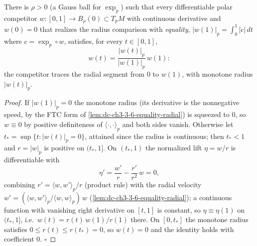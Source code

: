 \begin{lemma}
  \label{lem:dc-ch3-3-6-equality-ray}
  \leanok
  There is $\rho>0$ (a Gauss ball for $\exp_p$) such that every
  differentiable polar competitor $w:[0,1]\to B_\rho(0)\subset T_pM$ with
  continuous derivative and $w(0)=0$ that realizes the radius comparison with
  \emph{equality}, $|w(1)|_p=\int_0^1|\dot c|\,dt$ where $c=\exp_p\circ w$,
  satisfies, for every $t\in[0,1]$,
  $$w(t)=\frac{|w(t)|_p}{|w(1)|_p}\,w(1):$$
  the competitor traces the radial segment from $0$ to $w(1)$, with monotone
  radius $|w(t)|_p$.
\end{lemma}
\begin{proof}
  \leanok
  If $|w(1)|_p=0$ the monotone radius (its derivative is the nonnegative
  speed, by the FTC form of \cref{lem:dc-ch3-3-6-equality-radial}) is
  squeezed to $0$, so $w\equiv0$ by positive definiteness of
  $\langle\cdot,\cdot\rangle_p$ and both sides vanish. Otherwise let
  $t_*=\sup\{t:|w(t)|_p=0\}$, attained since the radius is continuous; then
  $t_*<1$ and $r=|w|_p$ is positive on $(t_*,1]$. On $(t_*,1)$ the
  normalized lift $\eta=w/r$ is differentiable with
  $$\eta'=\frac{w'}{r}-\frac{r'}{r^2}\,w=0,$$
  combining $r'=\langle w,w'\rangle_p/r$ (product rule) with the radial
  velocity $w'=(\langle w,w'\rangle_p/\langle w,w\rangle_p)\,w$
  (\cref{lem:dc-ch3-3-6-equality-radial}); a continuous function with
  vanishing right derivative on $[t,1]$ is constant, so $\eta\equiv\eta(1)$
  on $(t_*,1]$, i.e.\ $w(t)=r(t)\,w(1)/r(1)$ there. On $[0,t_*]$ the
  monotone radius satisfies $0\le r(t)\le r(t_*)=0$, so $w(t)=0$ and the
  identity holds with coefficient $0$. $\square$
\end{proof}

